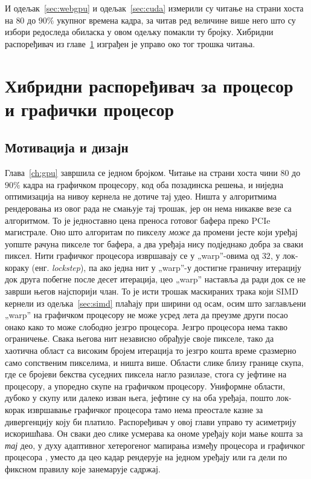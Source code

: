 \documentclass[serbian]{ftndiplomski}
\begin{document}
И одељак~\ref{sec:webgpu} и одељак~\ref{sec:cuda} измерили су читање на страни хоста
на $80$ до $90\%$ укупног времена кадра, за читав ред величине више него што су
избори редоследа обиласка у овом одељку помакли ту бројку. Хибридни распоређивач из
главе~\ref{ch:scheduler} изграђен је управо око тог трошка читања.

\chapter{Хибридни распоређивач за процесор и графички процесор}
\label{ch:scheduler}

\section{Мотивација и дизајн}
\label{sec:scheduler-motivation}

Глава~\ref{ch:gpu} завршила се једном бројком. Читање на страни хоста чини $80$ до
$90\%$ кадра на графичком процесору, код оба позадинска решења, и ниједна оптимизација
на нивоу кернела не дотиче тај удео. Ништа у алгоритмима рендеровања из овог рада не
смањује тај трошак, јер он нема никакве везе са алгоритмом. То је једноставно цена
преноса готовог бафера преко PCIe магистрале. Оно што алгоритам по пикселу
\emph{може} да промени јесте који уређај уопште рачуна пикселе тог бафера, а два
уређаја нису подједнако добра за сваки пиксел. Нити графичког процесора извршавају се
у „warp''-овима од $32$, у лок-кораку (енг. \emph{lockstep}), па ако једна нит у
„warp''-у достигне граничну итерацију док друга побегне после десет итерација, цео
„warp'' наставља да ради док се не заврши његов најспорији члан. То је исти трошак
маскираних трака који SIMD кернели из одељка~\ref{sec:simd} плаћају при ширини од осам,
осим што заглављени „warp'' на графичком процесору не може усред лета да преузме
други посао онако како то може слободно језгро процесора. Језгро процесора нема такво
ограничење. Свака његова нит независно обрађује своје пикселе, тако да хаотична област
са високим бројем итерација то језгро кошта време сразмерно само сопственим
пикселима, и ништа више. Области слике близу границе скупа, где се бројеви бекства
суседних пиксела нагло разилазе, стога су јефтине на процесору, а упоредно скупе на
графичком процесору. Униформне области, дубоко у скупу или далеко изван њега, јефтине
су на оба уређаја, пошто лок-корак извршавање графичког процесора тамо нема преостале
казне за дивергенцију коју би платило. Распоређивач у овој глави управо ту асиметрију
искоришћава. Он сваки део слике усмерава ка ономе уређају који мање кошта за \emph{тај}
део, у духу адаптивног хетерогеног мапирања између процесора и графичког процесора
\cite{luk2009qilin}, уместо да цео кадар рендерује на једном уређају или га дели по
фиксном правилу које занемарује садржај.
\end{document}
